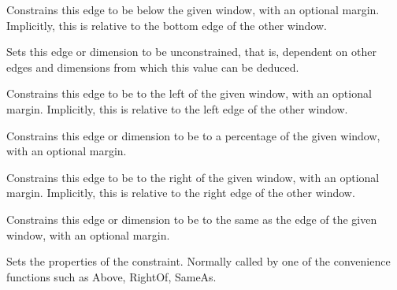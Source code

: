 \label{wxindividuallayoutconstraintbelow}


Constrains this edge to be below the given window, with an
optional margin. Implicitly, this is relative to the bottom edge of the other window.

\label{wxindividuallayoutconstraintunconstrained}


Sets this edge or dimension to be unconstrained, that is, dependent on
other edges and dimensions from which this value can be deduced.

\label{wxindividuallayoutconstraintleftof}


Constrains this edge to be to the left of the given window, with an
optional margin. Implicitly, this is relative to the left edge of the other window.

\label{wxindividuallayoutconstraintpercentof}


Constrains this edge or dimension to be to a percentage of the given window, with an
optional margin.

\label{wxindividuallayoutconstraintrightof}


Constrains this edge to be to the right of the given window, with an
optional margin. Implicitly, this is relative to the right edge of the other window.

\label{wxindividuallayoutconstraintsameas}


Constrains this edge or dimension to be to the same as the edge of the given window, with an
optional margin.

\label{wxindividuallayoutconstraintset}


Sets the properties of the constraint. Normally called by one of the convenience
functions such as Above, RightOf, SameAs.


